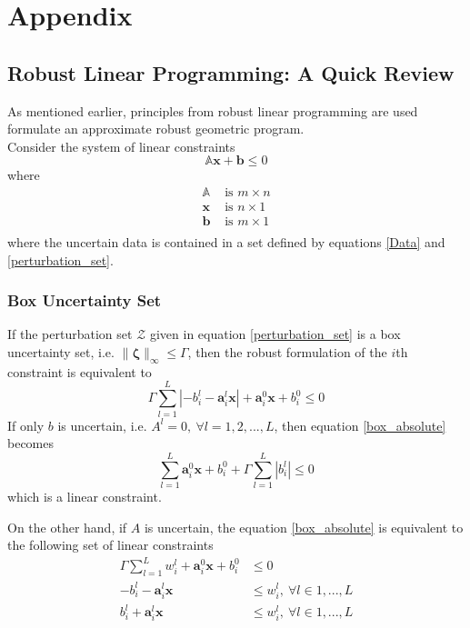 \section*{Appendix}

\subsection{Robust Linear Programming: A Quick Review} \label{LP_to_GP}

As mentioned earlier, principles from robust linear programming are used
formulate an approximate robust geometric program.\\[12pt]
Consider the system of linear constraints
\begin{equation*}
    \mathbb{A}\mathbf{x} + \mathbf{b} \leq 0
\end{equation*}
where
\begin{align*}
    \mathbb{A} &\text{ is $m \times n$}\\
    \mathbf{x} &\text{ is $n \times 1$}\\
    \mathbf{b} &\text{ is $m \times 1$}\\
\end{align*}
where the uncertain data is contained in a set defined by equations \eqref{Data} and \eqref{perturbation_set}.

\subsubsection{Box Uncertainty Set}
If the perturbation set $\mathcal{Z}$ given in equation \eqref{perturbation_set} is a box
uncertainty set, i.e. $\|\mathbf{\zeta}\|_{\infty} \leq \Gamma$, then the robust formulation of the $i$th constraint is equivalent to
\begin{equation}
    \Gamma \textstyle{\sum}_{l=1}^L |- {b}^l_{i} - \mathbf{a}^l_i\mathbf{x}| + \mathbf{a}^0_i\mathbf{x} + b^0_i \leq 0
    \label{box_absolute}
\end{equation}
If only $b$ is uncertain, i.e. $A^l = 0,~\forall l = 1,2,...,L$, then equation \eqref{box_absolute} becomes
\begin{equation}
    \textstyle{\sum}_{l=1}^L \mathbf{a}^0_{i}\mathbf{x} + b^0_{i} + \Gamma \textstyle{\sum}_{l=1}^L |b^l_{i}| \leq 0
    \label{box_coeff}
\end{equation}
which is a linear constraint.

On the other hand, if $A$ is uncertain, the equation \eqref{box_absolute} is equivalent to the following set of linear constraints
\begin{equation}
    \label{box_linear}
    \begin{split}
        \Gamma \textstyle{\sum}_{l=1}^L w^l_{i} + \mathbf{a}^0_{i}\mathbf{x} + b^0_{i} &\leq 0 \\
        - b^l_{i} - \mathbf{a}^l_{i}\mathbf{x} &\leq w^l_{i},~\forall l \in 1,...,L\\
        b^l_{i} + \mathbf{a}^l_{i}\mathbf{x} &\leq w^l_{i},~\forall l \in 1,...,L\\
    \end{split}
\end{equation}

